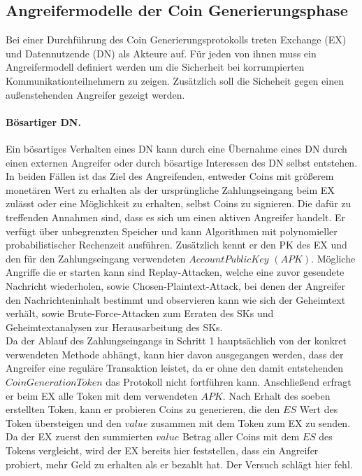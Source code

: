 \documentclass[
	fontsize=11pt,
	headings=small,
	parskip=half,           %
	bibliography=totoc,
	numbers=noenddot,       %
	open=any,               %
]{scrreprt}
\begin{document}
\subsection{Angreifermodelle der Coin Generierungsphase}
\label{subsec:adversaryCoinGen}
Bei einer Durchführung des Coin Generierungsprotokolls treten Exchange (EX) und Datennutzende (DN) als Akteure auf. Für jeden von ihnen muss ein Angreifermodell definiert werden um die Sicherheit bei korrumpierten Kommunikationteilnehmern zu zeigen. Zusätzlich soll die Sicheheit gegen einen außenstehenden Angreifer gezeigt werden.

\paragraph{Bösartiger DN.}
Ein bösartiges Verhalten eines DN kann durch eine Übernahme eines DN durch einen externen Angreifer oder durch bösartige Interessen des DN selbst entstehen. In beiden Fällen ist das Ziel des Angreifenden, entweder Coins mit größerem monetären Wert zu erhalten als der ursprüngliche Zahlungseingang beim EX zulässt oder eine Möglichkeit zu erhalten, selbst Coins zu signieren. Die dafür zu treffenden Annahmen sind, dass es sich um einen aktiven Angreifer handelt. Er verfügt über unbegrenzten Speicher und kann Algorithmen mit polynomieller probabilistischer Rechenzeit ausführen. Zusätzlich kennt er den PK des EX und den für den Zahlungseingang verwendeten $AccountPublicKey$ $(APK)$. Mögliche Angriffe die er starten kann sind Replay-Attacken, welche eine zuvor gesendete Nachricht wiederholen, sowie Chosen-Plaintext-Attack, bei denen der Angreifer den Nachrichteninhalt bestimmt und observieren kann wie sich der Geheimtext verhält, sowie Brute-Force-Attacken zum Erraten des SKs und Geheimtextanalysen zur Herausarbeitung des SKs.\\

Da der Ablauf des Zahlungseingangs in Schritt 1 hauptsächlich von der konkret verwendeten Methode abhängt, kann hier davon ausgegangen werden, dass der Angreifer eine reguläre Transaktion leistet, da er ohne den damit entstehenden $CoinGenerationToken$ das Protokoll nicht fortführen kann. 
Anschließend erfragt er beim EX alle Token mit dem verwendeten $APK$. Nach Erhalt des soeben erstellten Token, kann er probieren Coins zu generieren, die den $ES$ Wert des Token übersteigen und den $value$ zusammen mit dem Token zum EX zu senden. Da der EX zuerst den summierten $value$ Betrag aller Coins mit dem $ES$ des Tokens vergleicht, wird der EX bereits hier feststellen, dass ein Angreifer probiert, mehr Geld zu erhalten als er bezahlt hat. Der Versuch schlägt hier fehl.
\end{document}

